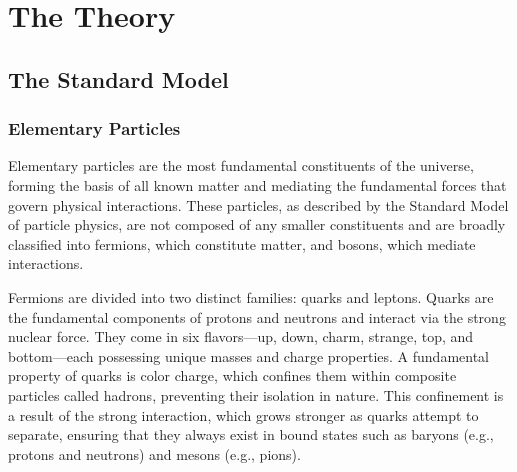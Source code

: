 \chapter{The Theory} \label{chap:chap-2}




    



\section{The Standard Model}


\subsection{Elementary Particles}

Elementary particles are the most fundamental constituents of the universe, forming the basis of all known matter and mediating the fundamental forces that govern physical interactions. These particles, as described by the Standard Model of particle physics, are not composed of any smaller constituents and are broadly classified into fermions, which constitute matter, and bosons, which mediate interactions. 

Fermions are divided into two distinct families: quarks and leptons. Quarks are the fundamental components of protons and neutrons and interact via the strong nuclear force. They come in six flavors—up, down, charm, strange, top, and bottom—each possessing unique masses and charge properties. A fundamental property of quarks is color charge, which confines them within composite particles called hadrons, preventing their isolation in nature. This confinement is a result of the strong interaction, which grows stronger as quarks attempt to separate, ensuring that they always exist in bound states such as baryons (e.g., protons and neutrons) and mesons (e.g., pions).  

